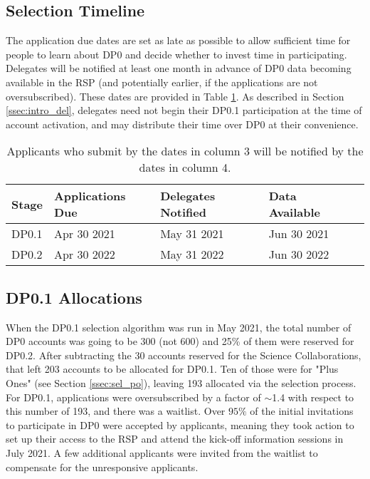 \documentclass[DM,lsstdraft,authoryear,toc]{lsstdoc}
\begin{document}
\subsection{Selection Timeline}\label{ssec:sel_time}

The application due dates are set as late as possible to allow sufficient time for people to learn about DP0 and decide whether to invest time in participating.
Delegates will be notified at least one month in advance of DP0 data becoming available in the RSP (and potentially earlier, if the applications are not oversubscribed).
These dates are provided in Table \ref{tab:selection_timeline}.
As described in Section \ref{ssec:intro_del}, delegates need not begin their DP0.1 participation at the time of account activation, and may distribute their time over DP0 at their convenience.

\begin{table}[!h]
\centering
\caption{Applicants who submit by the dates in column 3 will be notified by the dates in column 4.}\label{tab:selection_timeline}
\begin{tabular}{lllll}
\hline
Stage & Applications Due & Delegates Notified & Data Available \\
\hline \hline
DP0.1 & Apr 30 2021   &  May 31 2021  &  Jun 30 2021 \\
DP0.2 & Apr 30 2022   &  May 31 2022  &  Jun 30 2022 \\
\hline
\end{tabular}
\end{table}


\subsection{DP0.1 Allocations}\label{ssec:sel_dp01}

When the DP0.1 selection algorithm was run in May 2021, the total number of DP0 accounts was going to be 300 (not 600) and 25\% of them were reserved for DP0.2.
After subtracting the 30 accounts reserved for the Science Collaborations, that left 203 accounts to be allocated for DP0.1.
Ten of those were for "Plus Ones" (see Section \ref{ssec:sel_po}), leaving 193 allocated via the selection process.
For DP0.1, applications were oversubscribed by a factor of $\sim$1.4 with respect to this number of 193, and there was a waitlist.
Over $95\%$ of the initial invitations to participate in DP0 were accepted by applicants, meaning they took action to set up their access to the RSP and attend the kick-off information sessions in July 2021. 
A few additional applicants were invited from the waitlist to compensate for the unresponsive applicants. 
\end{document}
